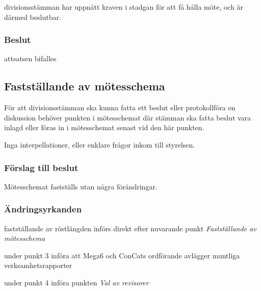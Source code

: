 \documentclass[protokoll]{dvd}
\begin{document}
\begin{attsatser}
	\item divisionsstämman har uppnått kraven i stadgan för att få hålla möte, och är därmed beslutbar.
\end{attsatser}

\subsubsection*{Beslut}

\begin{attsatser}
    \item attsatsen bifalles
\end{attsatser}

\subsection{Fastställande av mötesschema}

För att divisionsstämman ska kunna fatta ett beslut eller protokollföra en diskussion behöver punkten i mötesschemat där stämman ska fatta beslut vara inlagd eller föras in i mötesschemat senast vid den här punkten.

Inga interpellationer, eller enklare frågor inkom till styrelsen.


\subsubsection*{Förslag till beslut}

\begin{attsatser}
	\item Mötesschemat fastställs utan några förändringar.
\end{attsatser}

\subsubsection*{Ändringsyrkanden}

\begin{attsatser}
    \item fastställande av röstlängden införs direkt efter nuvarande punkt \emph{Fastställande av mötesschema} %
    \item under punkt 3 införa att Mega6 och ConCats ordförande avlägger muntliga verksamhetsrapporter %
    \item under punkt 4 införa punkten \emph{Val av revisorer} %
\end{attsatser}
\end{document}
